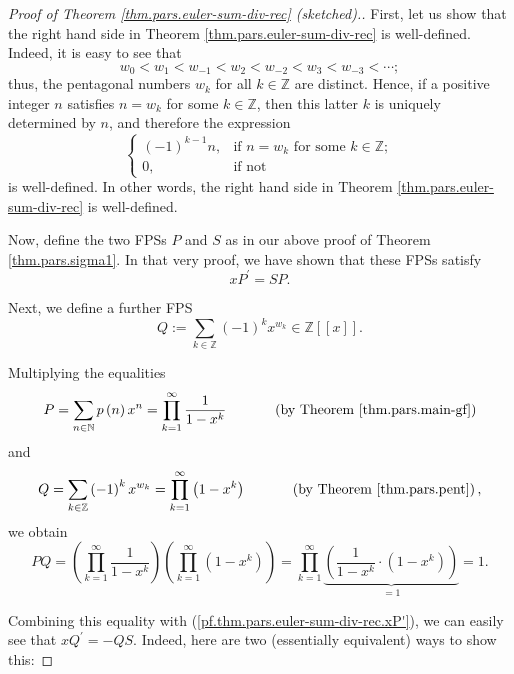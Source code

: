 \begin{proof}
[Proof of Theorem \ref{thm.pars.euler-sum-div-rec} (sketched).]First, let us
show that the right hand side in Theorem \ref{thm.pars.euler-sum-div-rec} is
well-defined. Indeed, it is easy to see that
\[
w_{0}<w_{1}<w_{-1}<w_{2}<w_{-2}<w_{3}<w_{-3}<\cdots;
\]
thus, the pentagonal numbers $w_{k}$ for all $k\in\mathbb{Z}$ are distinct.
Hence, if a positive integer $n$ satisfies $n=w_{k}$ for some $k\in\mathbb{Z}%
$, then this latter $k$ is uniquely determined by $n$, and therefore the
expression%
\[%
\begin{cases}
\left(  -1\right)  ^{k-1}n, & \text{if }n=w_{k}\text{ for some }k\in
\mathbb{Z};\\
0, & \text{if not}%
\end{cases}
\]
is well-defined. In other words, the right hand side in Theorem
\ref{thm.pars.euler-sum-div-rec} is well-defined.

Now, define the two FPSs $P$ and $S$ as in our above proof of Theorem
\ref{thm.pars.sigma1}. In that very proof, we have shown that these FPSs
satisfy
\begin{equation}
xP^{\prime}=SP. \label{pf.thm.pars.euler-sum-div-rec.xP'}%
\end{equation}


Next, we define a further FPS%
\[
Q:=\sum_{k\in\mathbb{Z}}\left(  -1\right)  ^{k}x^{w_{k}}\in\mathbb{Z}\left[
\left[  x\right]  \right]  .
\]


Multiplying the equalities%
\[
P=\sum_{n\in\mathbb{N}}p\left(  n\right)  x^{n}=\prod_{k=1}^{\infty}\dfrac
{1}{1-x^{k}}\ \ \ \ \ \ \ \ \ \ \left(  \text{by Theorem
\ref{thm.pars.main-gf}}\right)
\]
and%
\[
Q=\sum_{k\in\mathbb{Z}}\left(  -1\right)  ^{k}x^{w_{k}}=\prod\limits_{k=1}%
^{\infty}\left(  1-x^{k}\right)  \ \ \ \ \ \ \ \ \ \ \left(  \text{by Theorem
\ref{thm.pars.pent}}\right)  ,
\]
we obtain%
\[
PQ=\left(  \prod_{k=1}^{\infty}\dfrac{1}{1-x^{k}}\right)  \left(
\prod\limits_{k=1}^{\infty}\left(  1-x^{k}\right)  \right)  =\prod
\limits_{k=1}^{\infty}\underbrace{\left(  \dfrac{1}{1-x^{k}}\cdot\left(
1-x^{k}\right)  \right)  }_{=1}=1.
\]


Combining this equality with (\ref{pf.thm.pars.euler-sum-div-rec.xP'}), we can
easily see that $xQ^{\prime}=-QS$. Indeed, here are two (essentially
equivalent) ways to show this:


\end{proof}
